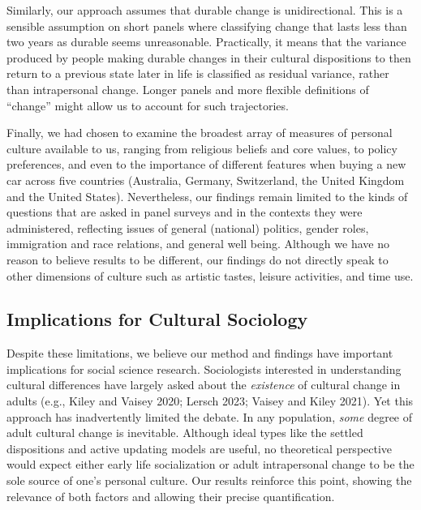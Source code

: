 \documentclass[
  12pt,
]{article}
\begin{document}
Similarly, our approach assumes that durable change is unidirectional.
This is a sensible assumption on short panels where classifying change
that lasts less than two years as durable seems unreasonable.
Practically, it means that the variance produced by people making
durable changes in their cultural dispositions to then return to a
previous state later in life is classified as residual variance, rather
than intrapersonal change. Longer panels and more flexible definitions
of ``change'' might allow us to account for such trajectories.

Finally, we had chosen to examine the broadest array of measures of
personal culture available to us, ranging from religious beliefs and
core values, to policy preferences, and even to the importance of
different features when buying a new car across five countries
(Australia, Germany, Switzerland, the United Kingdom and the United
States). Nevertheless, our findings remain limited to the kinds of
questions that are asked in panel surveys and in the contexts they were
administered, reflecting issues of general (national) politics, gender
roles, immigration and race relations, and general well being. Although
we have no reason to believe results to be different, our findings do
not directly speak to other dimensions of culture such as artistic
tastes, leisure activities, and time use.

\hypertarget{implications-for-cultural-sociology}{%
\subsection{Implications for Cultural
Sociology}\label{implications-for-cultural-sociology}}

Despite these limitations, we believe our method and findings have
important implications for social science research. Sociologists
interested in understanding cultural differences have largely asked
about the \emph{existence} of cultural change in adults (e.g., Kiley and
Vaisey 2020; Lersch 2023; Vaisey and Kiley 2021). Yet this approach has
inadvertently limited the debate. In any population, \emph{some} degree
of adult cultural change is inevitable. Although ideal types like the
settled dispositions and active updating models are useful, no
theoretical perspective would expect either early life socialization or
adult intrapersonal change to be the sole source of one's personal
culture. Our results reinforce this point, showing the relevance of both
factors and allowing their precise quantification.
\end{document}
